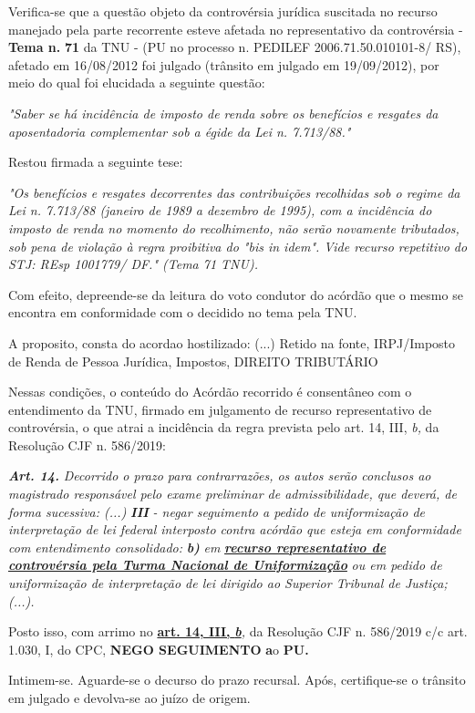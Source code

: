 \documentclass[12pt]{article}
\begin{document}
\justifying
\noindent Verifica-se que a questão objeto da controvérsia jurídica suscitada no recurso manejado pela parte recorrente esteve afetada no representativo da controvérsia - \textbf{Tema n. }\textbf{71} da TNU - (PU no processo n. PEDILEF 2006.71.50.010101-8/ RS),  afetado em 16/08/2012 foi julgado (trânsito em julgado em 19/09/2012), por meio do qual foi elucidada a seguinte questão:

\noindent \textit{"Saber se há incidência de imposto de renda sobre os benefícios e resgates da aposentadoria complementar sob a égide da Lei n. 7.713/88."}

\noindent Restou firmada a seguinte tese:

\noindent \textit{"Os benefícios e resgates decorrentes das contribuições recolhidas sob o regime da Lei n. 7.713/88 (janeiro de 1989 a dezembro de 1995), com a incidência do imposto de renda no momento do recolhimento, não serão novamente tributados, sob pena de violação à regra proibitiva do "bis in idem". Vide recurso repetitivo do STJ: REsp 1001779/ DF." (Tema 71 TNU).}

\noindent Com efeito, depreende-se da leitura do voto condutor do acórdão que o mesmo se encontra em conformidade com o decidido no  tema pela TNU.

\noindent A proposito, consta do acordao hostilizado: (...) Retido na fonte, IRPJ/Imposto de Renda de Pessoa Jurídica, Impostos, DIREITO TRIBUTÁRIO

\noindent Nessas condições, o conteúdo do Acórdão recorrido é consentâneo com o entendimento da TNU, firmado em julgamento de recurso representativo de controvérsia, o que atrai a incidência da regra prevista pelo art. 14, III, \textit{b,} da Resolução CJF n. 586/2019:

\noindent \textit{\textbf{Art. 14.}}\textit{ Decorrido o prazo para contrarrazões, os autos serão conclusos ao magistrado responsável pelo exame preliminar de admissibilidade, que deverá, de forma sucessiva: (...) }\textit{\textbf{III }}\textit{- negar seguimento a pedido de uniformização de interpretação de lei federal interposto contra acórdão que esteja em conformidade com entendimento consolidado: }\textit{\textbf{b)}}\textit{ em }\uline{\textit{\textbf{recurso representativo de controvérsia pela Turma Nacional de Uniformização}}}\textit{ ou em pedido de uniformização de interpretação de lei dirigido ao Superior Tribunal de Justiça;(...).}

\noindent Posto isso, com arrimo no \uline{\textbf{art. 14, III, }}\uline{\textit{\textbf{b}}}\textit{,} da Resolução CJF n. 586/2019 c/c art. 1.030, I, do CPC, \textbf{NEGO SEGUIMENTO }\textbf{a}o\textbf{ PU}\textbf{.}

\noindent Intimem-se. Aguarde-se o decurso do prazo recursal. Após, certifique-se o trânsito em julgado e devolva-se ao juízo de origem.
\end{document}
